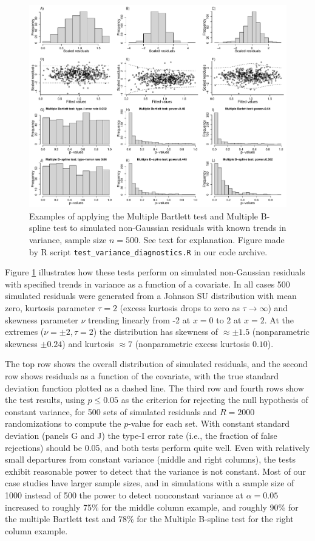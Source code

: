 \documentclass[12pt]{article}
\begin{document}
\begin{figure}[tbp]
\centering
\includegraphics[width=\textwidth]{figures/test_variance_diagnostics.pdf}
\caption{Examples of applying the Multiple Bartlett test and Multiple B-spline test to simulated non-Gaussian residuals with known trends in variance, sample size $n=500$. 
See text for explanation. Figure made by R script \texttt{test\_variance\_diagnostics.R} in our code archive. }
\label{fig:ncv}
\end{figure} 

Figure \ref{fig:ncv} illustrates how these tests perform on simulated non-Gaussian residuals with specified trends in variance as a function of a covariate.
In all cases 500 simulated residuals were generated from a Johnson SU distribution with mean zero, kurtosis parameter $\tau = 2$ (excess kurtosis drops to zero as $\tau \to \infty$)
and skewness parameter $\nu$ trending linearly from -2 at $x=0$ to 2 at $x=2$. At the extremes ($\nu = \pm 2, \tau =2$) the distribution has skewness of $\approx \pm 1.5$
(nonparametric skewness $\pm 0.24$) and kurtosis $\approx 7$ (nonparametric excess kurtosis $0.10$).   

The top row shows the overall distribution of simulated residuals, and the second row shows residuals as a function of the covariate, with the true standard deviation 
function plotted as a dashed line. The third row and fourth rows show the test results, using $p \le 0.05$ as the criterion for rejecting the null hypothesis
of constant variance, for 500 sets of simulated residuals and $R=2000$ randomizations to compute the $p$-value for each set.  
With constant standard deviation (panels G and J) the type-I error rate (i.e., the fraction of false rejections) should be 0.05, 
and both tests perform quite well. Even with relatively small departures from constant variance (middle and right columns), the tests 
exhibit reasonable power to detect that the variance is not constant. Most of our case studies have larger sample sizes, and in simulations with a sample size 
of 1000 instead of 500 the power to detect nonconstant variance at $\alpha = 0.05$ increased to roughly 75\% for the middle column example, and roughly 90\% for the
multiple Bartlett test and 78\% for the Multiple B-spline test for the right column example.  
\end{document}
